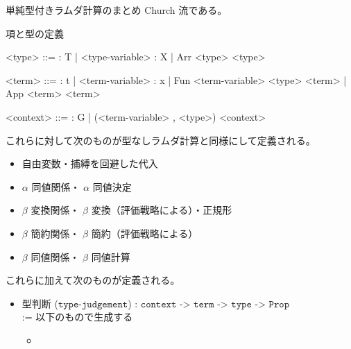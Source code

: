 \documentclass[dvipdfmx]{jsarticle}
\begin{document}
単純型付きラムダ計算のまとめ
Church 流である。

\begin{itembox}[l]{項と型の定義}
  \begin{bnfgrammar}
    <type> ::= : T
    | <type-variable> : X
    | Arr <type> <type>
  \end{bnfgrammar}
  \begin{bnfgrammar}
    <term> ::= : t 
    | <term-variable> : x
    | Fun <term-variable> <type> <term>
    | App <term> <term>
  \end{bnfgrammar}
  \begin{bnfgrammar}
    <context> ::= : G
    | (<term-variable> , <type>) <context>
  \end{bnfgrammar}
\end{itembox}

これらに対して次のものが型なしラムダ計算と同様にして定義される。
\begin{itemize}
  \item 自由変数・捕縛を回避した代入
  \item \(\alpha\) 同値関係・ \(\alpha\) 同値決定
  \item \(\beta\) 変換関係・ \(\beta\) 変換（評価戦略による）・正規形
  \item \(\beta\) 簡約関係・ \(\beta\) 簡約（評価戦略による）
  \item \(\beta\) 同値関係・ \(\beta\) 同値計算
\end{itemize}

これらに加えて次のものが定義される。

\begin{itemize}
  \item 型判断 (\(\texttt{type-judgement}\)) : \(\texttt{context -> term -> type -> Prop}\) \\
    := 以下のもので生成する
    \begin{itemize}
      \item 
    \end{itemize}
\end{itemize}
\end{document}
